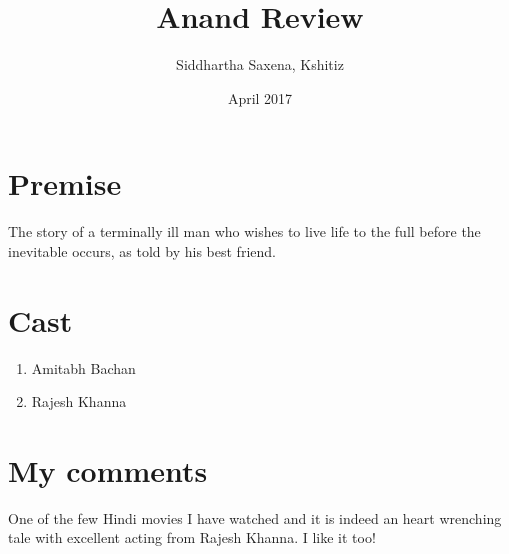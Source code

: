 \documentclass{article}
\title{Anand Review}
\author{Siddhartha Saxena, Kshitiz}
\date{April 2017}
\begin{document}
\maketitle
\section{Premise}
The story of a terminally ill man who wishes to live life to the full before the inevitable occurs, as told by his best friend.
\section{Cast}
\begin{enumerate}
	\item Amitabh Bachan
	\item Rajesh Khanna
\end{enumerate}	
\section{My comments}
One of the few Hindi movies I have watched and it is indeed an heart wrenching tale with excellent acting from Rajesh Khanna.
I like it too!
\end{document}
